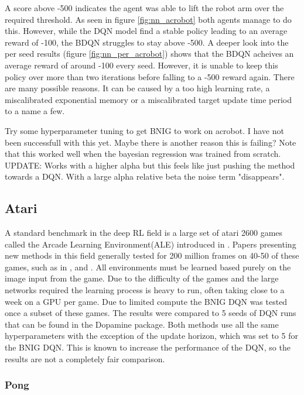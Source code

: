 A score above -500 indicates the agent was able to lift the robot arm over the required threshold. As seen in figure \ref{fig:nn_acrobot} both agents manage to do this. However, while the DQN model find a stable policy leading to an average reward of -100, the BDQN struggles to stay above -500. A deeper look into the per seed results (figure \ref{fig:nn_per_acrobot}) shows that the BDQN acheives an average reward of around -100 every seed. However, it is unable to keep this policy over more than two iterations before falling to a -500 reward again. There are many possible reasons. It can be caused by a too high learning rate, a miscalibrated exponential memory or a miscalibrated target update time period to a name a few.

\todo Try some hyperparameter tuning to get BNIG to work on acrobot. I have not been successfull with this yet. Maybe there is another reason this is failing? Note that this worked well when the bayesian regression was trained from scratch. UPDATE: Works with a higher alpha but this feels like just pushing the method towards a DQN. With a large alpha relative beta the noise term "disappears".

\subsection{Atari}

A standard benchmark in the deep RL field is a large set of atari 2600 games called the Arcade Learning Environment(ALE) introduced in \cite{bellemare_13}. Papers presenting new methods in this field generally tested for 200 million frames on 40-50 of these games, such as in \cite{mnih_2015}, \cite{mnih_2016} and \cite{donoghue_2017}. All environments must be learned based purely on the image input from the game. Due to the difficulty of the games and the large networks required the learning process is heavy to run, often taking close to a week on a GPU per game. Due to limited compute the BNIG DQN was tested once a subset of these games. The results were compared to 5 seeds of DQN runs that can be found in the Dopamine package. Both methods use all the same hyperparameters with the exception of the update horizon, which was set to 5 for the BNIG DQN. This is known to increase the performance of the DQN, so the results are not a completely fair comparison.

\subsubsection{Pong}

